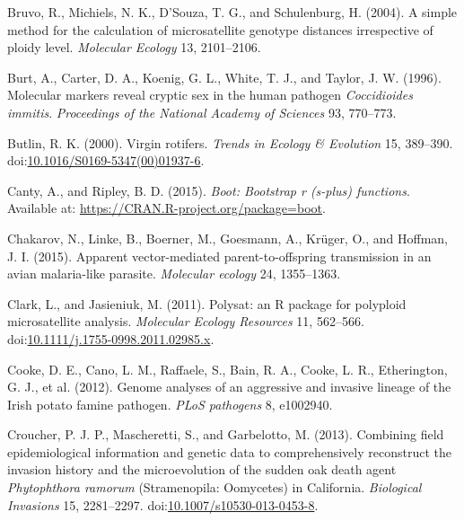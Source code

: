 \documentclass[double,12pt]{beavtex}
\begin{document}
  \hypertarget{ref-bruvo2004simple}{}
  Bruvo, R., Michiels, N. K., D'Souza, T. G., and Schulenburg, H. (2004).
  A simple method for the calculation of microsatellite genotype distances
  irrespective of ploidy level. \emph{Molecular Ecology} 13, 2101--2106.
  
  \hypertarget{ref-burt1996molecular}{}
  Burt, A., Carter, D. A., Koenig, G. L., White, T. J., and Taylor, J. W.
  (1996). Molecular markers reveal cryptic sex in the human pathogen
  \emph{Coccidioides immitis}. \emph{Proceedings of the National Academy
  of Sciences} 93, 770--773.
  
  \hypertarget{ref-butlin2000virgin}{}
  Butlin, R. K. (2000). Virgin rotifers. \emph{Trends in Ecology \&
  Evolution} 15, 389--390.
  doi:\href{https://doi.org/10.1016/S0169-5347(00)01937-6}{10.1016/S0169-5347(00)01937-6}.
  
  \hypertarget{ref-canty2015boot}{}
  Canty, A., and Ripley, B. D. (2015). \emph{Boot: Bootstrap r (s-plus)
  functions}. Available at: \url{https://CRAN.R-project.org/package=boot}.
  
  \hypertarget{ref-chakarov2015apparent}{}
  Chakarov, N., Linke, B., Boerner, M., Goesmann, A., Krüger, O., and
  Hoffman, J. I. (2015). Apparent vector-mediated parent-to-offspring
  transmission in an avian malaria-like parasite. \emph{Molecular ecology}
  24, 1355--1363.
  
  \hypertarget{ref-polysat}{}
  Clark, L., and Jasieniuk, M. (2011). Polysat: an R package for polyploid
  microsatellite analysis. \emph{Molecular Ecology Resources} 11,
  562--566.
  doi:\href{https://doi.org/10.1111/j.1755-0998.2011.02985.x}{10.1111/j.1755-0998.2011.02985.x}.
  
  \hypertarget{ref-cooke2012genome}{}
  Cooke, D. E., Cano, L. M., Raffaele, S., Bain, R. A., Cooke, L. R.,
  Etherington, G. J., et al. (2012). Genome analyses of an aggressive and
  invasive lineage of the Irish potato famine pathogen. \emph{PLoS
  pathogens} 8, e1002940.
  
  \hypertarget{ref-croucher2013combining}{}
  Croucher, P. J. P., Mascheretti, S., and Garbelotto, M. (2013).
  Combining field epidemiological information and genetic data to
  comprehensively reconstruct the invasion history and the microevolution
  of the sudden oak death agent \emph{Phytophthora ramorum} (Stramenopila:
  Oomycetes) in California. \emph{Biological Invasions} 15, 2281--2297.
  doi:\href{https://doi.org/10.1007/s10530-013-0453-8}{10.1007/s10530-013-0453-8}.
  
\end{document}
